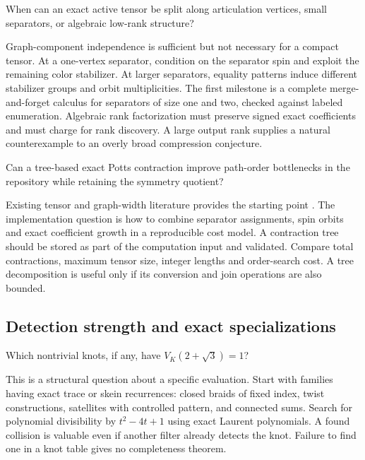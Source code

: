 \begin{question}
When can an exact active tensor be split along articulation vertices,
small separators, or algebraic low-rank structure?
\end{question}

Graph-component independence is sufficient but not necessary for a compact
tensor. At a one-vertex separator, condition on the separator spin and
exploit the remaining color stabilizer. At larger separators, equality
patterns induce different stabilizer groups and orbit multiplicities.
The first milestone is a complete merge-and-forget calculus for separators
of size one and two, checked against labeled enumeration.
Algebraic rank factorization must preserve signed exact coefficients and
must charge for rank discovery. A large output rank supplies a natural
counterexample to an overly broad compression conjecture.

\begin{question}
Can a tree-based exact Potts contraction improve path-order bottlenecks in
the repository while retaining the symmetry quotient?
\end{question}

Existing tensor and graph-width literature provides the starting point
\cite{meichanetzidis2019,maria2021}. The implementation question is how to
combine separator assignments, spin orbits and exact coefficient growth in
a reproducible cost model. A contraction tree should be stored as part of
the computation input and validated. Compare total contractions, maximum
tensor size, integer lengths and order-search cost. A tree decomposition
is useful only if its conversion and join operations are also bounded.

\subsection{Detection strength and exact specializations}

\begin{question}
Which nontrivial knots, if any, have $V_K(2+\sqrt3)=1$?
\end{question}

This is a structural question about a specific evaluation. Start with
families having exact trace or skein recurrences: closed braids of fixed
index, twist constructions, satellites with controlled pattern, and
connected sums. Search for polynomial divisibility by $t^2-4t+1$ using
exact Laurent polynomials. A found collision is valuable even if another
filter already detects the knot. Failure to find one in a knot table gives
no completeness theorem.

